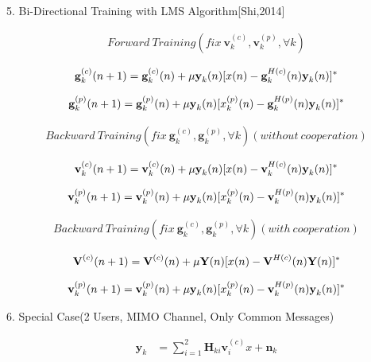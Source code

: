 \documentclass[11pt, oneside]{article}   	%
\begin{document}
5. Bi-Directional Training with LMS Algorithm[Shi,2014]

\begin{align*}
Forward\ Training (fix\  \textbf{v}^{(c)}_{k}, \textbf{v}^{(p)}_{k}, \forall k)
\end{align*}

\begin{align*}
\textbf{g}^{(c)}_{k}(n+1)= \textbf{g}^{(c)}_{k}(n)+ \mu \textbf y_k(n) [x(n)- \textbf{g}^{H(c)}_{k}(n) \textbf y_k(n)]^*
\end{align*}

\begin{align*}
\textbf{g}^{(p)}_{k}(n+1)= \textbf{g}^{(p)}_{k}(n)+ \mu \textbf y_k(n) [x_k^{(p)}(n)- \textbf{g}^{H(p)}_{k}(n) \textbf y_k(n)]^*
\end{align*}

\begin{align*}
Backward\ Training (fix\  \textbf{g}^{(c)}_{k}, \textbf{g}^{(p)}_{k}, \forall k)(without\ cooperation)
\end{align*}

\begin{align*}
\textbf{v}^{(c)}_{k}(n+1)= \textbf{v}^{(c)}_{k}(n)+ \mu \textbf y_k(n) [x(n)- \textbf{v}^{H(c)}_{k}(n) \textbf y_k(n)]^*
\end{align*}

\begin{align*}
\textbf{v}^{(p)}_{k}(n+1)= \textbf{v}^{(p)}_{k}(n)+ \mu \textbf y_k(n) [x_k^{(p)}(n)- \textbf{v}^{H(p)}_{k}(n) \textbf y_k(n)]^*
\end{align*}

\begin{align*}
Backward\ Training (fix\  \textbf{g}^{(c)}_{k}, \textbf{g}^{(p)}_{k}, \forall k)(with\ cooperation)
\end{align*}

\begin{align*}
\textbf{V}^{(c)}(n+1)= \textbf{V}^{(c)}(n)+ \mu \textbf Y(n) [x(n)- \textbf{V}^{H(c)}(n) \textbf Y(n)	]^*
\end{align*}

\begin{align*}
\textbf{v}^{(p)}_{k}(n+1)= \textbf{v}^{(p)}_{k}(n)+ \mu \textbf y_k(n) [x_k^{(p)}(n)- \textbf{v}^{H(p)}_{k}(n) \textbf y_k(n)]^*
\end{align*}


6. Special Case(2 Users,  MIMO Channel, Only Common Messages)

\begin{align*}
\textbf{y}_{k} &=	\displaystyle\sum_{i=1}^{2}\textbf{H}_{ki}\textbf{v}^{(c)}_{i}x	+	\textbf{n}_{k}
\end{align*}
\end{document}
